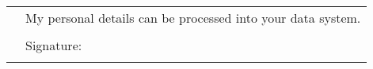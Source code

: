\documentclass[helvetica, openbib, totpages, english]{europecv}
\begin{document}
	\null{}
	\flushright
	\begin{tabular}{rp{250pt}}
	 & \small My personal details can be processed into your data system.\\ 
	 &  \\ 
	 & Signature:\\ 
	 &  \\
	  \bottomrule
	\end{tabular}
	
\end{document}
